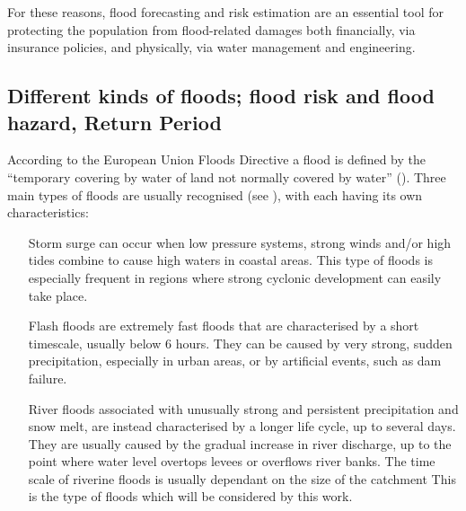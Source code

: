 For these reasons, flood forecasting and risk estimation are an essential tool for protecting the population from flood-related damages both financially, via insurance policies, and physically, via water management and engineering.

\subsection{Different kinds of floods; flood risk and flood hazard, Return Period}
According to the European Union Floods Directive a flood is defined by the \enquote{temporary covering by water of land not normally covered by water} (\cite{EUFD2007}).
Three main types of floods are usually recognised (see \cite{Kron2005}), with each having its own characteristics:
\begin{itemize}
    \item[Storm surge] can occur when low pressure systems, strong winds and/or high tides combine to cause high waters in coastal areas. This type of floods is especially frequent in regions where strong cyclonic development can easily take place.
    \item[Flash floods] are extremely fast floods that are characterised by a short timescale, usually below 6 hours. They can be caused by very strong, sudden precipitation, especially in urban areas, or by artificial events, such as dam failure.
    \item[River floods] associated with unusually strong and persistent precipitation and snow melt, are instead characterised by a longer life cycle, up to several days. They are usually caused by the gradual increase in river discharge, up to the point where water level overtops levees or overflows river banks. The time scale of riverine floods is usually dependant on the size of the catchment This is the type of floods which will be considered by this work.
\end{itemize}

